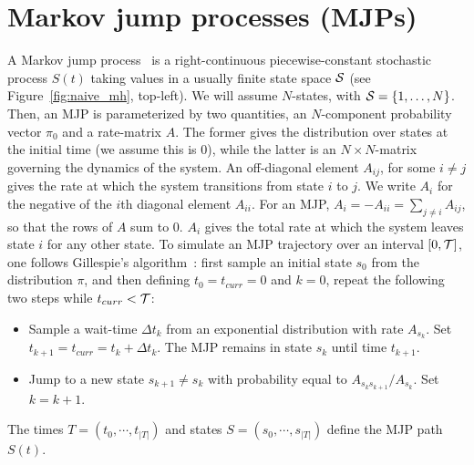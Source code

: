 \section{Markov jump processes (MJPs)} 
A Markov jump process~\cite{Cinlar1975} is a right-continuous 
piecewise-constant stochastic process $S(t)$ taking values in a 
usually finite state space ${\mathcal S}$ (see Figure~\ref{fig:naive_mh}, top-left).
We will assume $N$-states, with ${\mathcal S} = \{1,\ldots,N\}$. Then, 
an MJP is parameterized by two quantities, an $N$-component probability vector 
$\pi_0$ and a rate-matrix $A$. The former gives the distribution over states at 
the initial time (we assume this is $0$), while 
the latter is an $N \times N$-matrix governing the dynamics of the system.  An 
off-diagonal element $A_{ij}$, for some $i \neq j$ gives the rate at 
which the system transitions from state $i$ to $j$. We write $A_i$ for the 
negative of the $i$th diagonal element $A_{ii}$. For an MJP,
$A_i = -A_{ii} = \sum_{j \neq i} A_{ij}$, so that the rows of $A$ sum to $0$.  
$A_i$ gives the total rate at which the system leaves state $i$ for any other state.
To simulate an MJP trajectory over an interval $[0,{\mathcal T}]$, one follows 
Gillespie's algorithm~\cite{gillespie97}: 
first sample an initial state $s_0$ from the distribution $\pi$, and
then defining $t_0 = t_{curr} = 0$ and $k = 0$, repeat the following two steps while
$t_{curr} < {\mathcal T}$:
\begin{itemize}
  \item Sample a wait-time $\Delta t_k$ from an exponential distribution with rate 
    $A_{s_k}$.  Set $t_{k+1} = t_{curr} = t_{k} + \Delta t_k$.
    The MJP remains in state $s_k$ until time $t_{k+1}$.
  \item Jump to a new state $s_{k+1} \neq s_k$ with 
    probability equal to $A_{s_ks_{k+1}}/A_{s_k}$. Set $k=k+1$.
\end{itemize}
The times $T=(t_0, \cdots, t_{|T| })$ and states 
$S=(s_0, \cdots, s_{|T| })$ define the MJP path $S(t)$.

